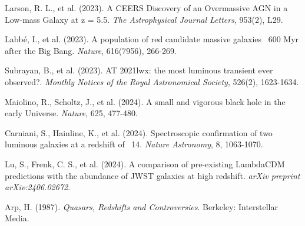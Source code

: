 \documentclass[pdflatex,sn-mathphys-num,referee]{sn-jnl}
\begin{document}
\begin{thebibliography}{99}
Larson, R. L., et al. (2023). A CEERS Discovery of an Overmassive AGN in a Low-mass Galaxy at z = 5.5. \textit{The Astrophysical Journal Letters}, 953(2), L29.

Labbé, I., et al. (2023). A population of red candidate massive galaxies ~600 Myr after the Big Bang. \textit{Nature}, 616(7956), 266-269.

Subrayan, B., et al. (2023). AT 2021lwx: the most luminous transient ever observed?. \textit{Monthly Notices of the Royal Astronomical Society}, 526(2), 1623-1634.

Maiolino, R., Scholtz, J., et al. (2024). A small and vigorous black hole in the early Universe. \textit{Nature}, 625, 477-480.

Carniani, S., Hainline, K., et al. (2024). Spectroscopic confirmation of two luminous galaxies at a redshift of ~14. \textit{Nature Astronomy}, 8, 1063-1070.

Lu, S., Frenk, C. S., et al. (2024). A comparison of pre-existing LambdaCDM predictions with the abundance of JWST galaxies at high redshift. \textit{arXiv preprint arXiv:2406.02672}.

Arp, H. (1987). \textit{Quasars, Redshifts and Controversies}. Berkeley: Interstellar Media.

\end{thebibliography}
\end{document}
